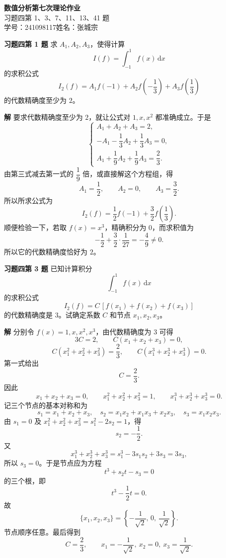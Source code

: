 \documentclass[UTF8,a4paper,11pt]{ctexart}
\newcommand{\dd}{\,\mathrm{d}}
\begin{document}
\begin{center}
  {\LARGE\bfseries 数值分析\quad 第七次理论作业}\\[6pt]
  {\large 习题四第 1、3、7、11、13、41 题}\\[4pt]
  {\normalsize 学号：241098117\quad 姓名：张城宗}
\end{center}

\bigskip

\noindent\textbf{习题四\quad 第 1 题}\quad
求 $A_1,A_2,A_3$，使得计算
\[
  I(f)=\int_{-1}^{1}f(x)\dd x
\]
的求积公式
\[
  I_2(f)=A_1f(-1)+A_2f\!\left(-\frac13\right)+A_3f\!\left(\frac13\right)
\]
的代数精确度至少为 $2$。

\medskip
\noindent\textbf{解}\quad
要求代数精确度至少为 $2$，就让公式对 $1,x,x^2$ 都准确成立。于是
\[
\begin{cases}
A_1+A_2+A_3=2,\\[2mm]
-A_1-\dfrac13 A_2+\dfrac13 A_3=0,\\[2mm]
A_1+\dfrac19 A_2+\dfrac19 A_3=\dfrac23.
\end{cases}
\]
由第三式减去第一式的 $\dfrac19$ 倍，或直接解这个方程组，得
\[
  A_1=\frac12,\qquad A_2=0,\qquad A_3=\frac32.
\]
所以所求公式为
\[
  \boxed{
  I_2(f)=\frac12 f(-1)+\frac32 f\!\left(\frac13\right).}
\]
顺便检验一下，若取 $f(x)=x^3$，精确积分为 $0$，而求积值为
\[
  -\frac12+\frac32\cdot\frac1{27}=-\frac49\ne0.
\]
所以它的代数精确度恰好为 $2$。

\bigskip\bigskip

\noindent\textbf{习题四\quad 第 3 题}\quad
已知计算积分
\[
  \int_{-1}^{1} f(x)\dd x
\]
的求积公式
\[
  I_2(f)=C\,[f(x_1)+f(x_2)+f(x_3)]
\]
的代数精确度是 $3$。试确定系数 $C$ 和节点 $x_1,x_2,x_3$。

\medskip
\noindent\textbf{解}\quad
分别令 $f(x)=1,x,x^2,x^3$，由代数精确度为 $3$ 可得
\[
  3C=2,\qquad
  C(x_1+x_2+x_3)=0,
\]
\[
  C(x_1^2+x_2^2+x_3^2)=\frac23,\qquad
  C(x_1^3+x_2^3+x_3^3)=0.
\]
第一式给出
\[
  C=\frac23.
\]
因此
\[
  x_1+x_2+x_3=0,\qquad
  x_1^2+x_2^2+x_3^2=1,\qquad
  x_1^3+x_2^3+x_3^3=0.
\]
记三个节点的基本对称和为
\[
  s_1=x_1+x_2+x_3,\quad
  s_2=x_1x_2+x_1x_3+x_2x_3,\quad
  s_3=x_1x_2x_3.
\]
由 $s_1=0$ 及 $x_1^2+x_2^2+x_3^2=s_1^2-2s_2=1$，得
\[
  s_2=-\frac12.
\]
又
\[
  x_1^3+x_2^3+x_3^3=s_1^3-3s_1s_2+3s_3=3s_3,
\]
所以 $s_3=0$。于是节点应为方程
\[
  t^3+s_2t-s_3=0
\]
的三个根，即
\[
  t^3-\frac12t=0.
\]
故
\[
  \{x_1,x_2,x_3\}=\left\{-\frac1{\sqrt2},\,0,\,\frac1{\sqrt2}\right\}.
\]
节点顺序任意。最后得到
\[
  \boxed{
  C=\frac23,\qquad
  x_1=-\frac1{\sqrt2},\ x_2=0,\ x_3=\frac1{\sqrt2}.}
\]
\end{document}
